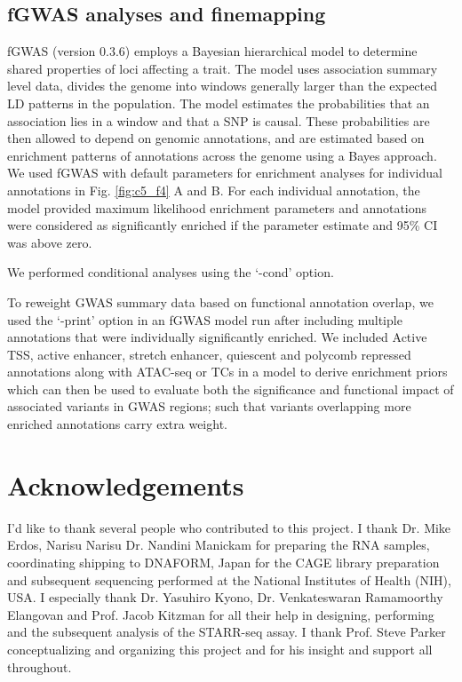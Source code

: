 \subsection{fGWAS analyses and finemapping}        
fGWAS (version 0.3.6) \cite{pickrellJointAnalysisFunctional2014} employs a Bayesian hierarchical model to determine shared properties of loci affecting a trait. The model uses association summary level data, divides the genome into windows generally larger than the expected LD patterns in the population. The model estimates the probabilities that an association lies in a window and that a SNP is causal. These probabilities are then allowed to depend on genomic annotations, and are estimated based on enrichment patterns of annotations across the genome using a Bayes approach. We used fGWAS with default parameters for enrichment analyses for individual annotations in Fig. \ref{fig:c5_f4} A and B. For each individual annotation, the model provided maximum likelihood enrichment parameters and annotations were considered as significantly enriched if the parameter estimate and 95\% CI was above zero. 


We performed conditional analyses using the ‘-cond’ option. 


To reweight GWAS summary data based on functional annotation overlap, we used the ‘-print’ option in an fGWAS model run after including multiple annotations that were individually significantly enriched. We included Active TSS, active enhancer, stretch enhancer, quiescent and polycomb repressed annotations along with ATAC-seq or TCs in a model to derive enrichment priors which can then be used to evaluate both the significance and functional impact of associated variants in GWAS regions; such that variants overlapping more enriched annotations carry extra weight.

\section{Acknowledgements}
I'd like to thank several people who contributed to this project. I thank Dr. Mike Erdos, Narisu Narisu Dr. Nandini Manickam for preparing the RNA samples, coordinating shipping to DNAFORM, Japan for the CAGE library preparation and subsequent sequencing performed at the National Institutes of Health (NIH), USA. I especially thank Dr. Yasuhiro Kyono, Dr. Venkateswaran Ramamoorthy Elangovan and Prof. Jacob Kitzman for all their help in designing, performing and the subsequent analysis of the STARR-seq assay. I thank Prof. Steve Parker conceptualizing and organizing this project and for his insight and support all throughout.